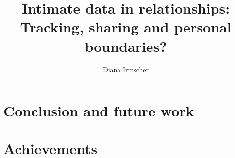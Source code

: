 \documentclass[journal]{vgtc}                %
\title{Intimate data in relationships: Tracking, sharing and personal boundaries?}
\author{Diana Irmscher}
\begin{document}

\maketitle

%
%










\section{Conclusion and future work}
\label{sec:conculsion}
\section{Achievements}

\printbibliography
\end{document}
